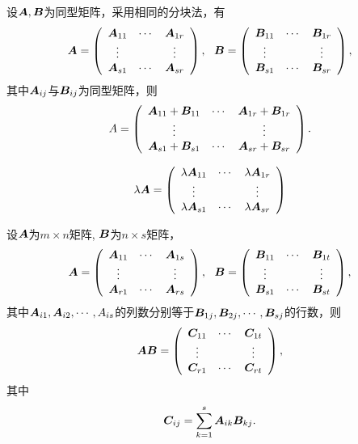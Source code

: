 \begin{dingyi}[分块矩阵的加法]
  设$\boldsymbol{A}, \boldsymbol{B}$为同型矩阵，采用相同的分块法，有
  $$
  \A = \left(
    \begin{array}{ccc}
      \A_{11} & \cd & \A_{1r} \\
      \vd   &     & \vd   \\
      \A_{s1} & \cd & \A_{sr}
    \end{array}
  \right), \ \ 
  \B = \left(
    \begin{array}{ccc}
      \B_{11} & \cd & \B_{1r} \\
      \vd   &     & \vd   \\
      \B_{s1} & \cd & \B_{sr}
    \end{array}
  \right),
  $$
  其中$\boldsymbol{A}_{ij}$与$\boldsymbol{B}_{ij}$为同型矩阵，则
  $$
  A = \left(
    \begin{array}{ccc}
      \boldsymbol{A}_{11} + \boldsymbol{B}_{11}  & \cdots & \boldsymbol{A}_{1r} + \boldsymbol{B}_{1r} \\
      \vdots   &     & \vdots   \\
      \boldsymbol{A}_{s1} + \boldsymbol{B}_{s1}  & \cdots & \boldsymbol{A}_{sr} + \boldsymbol{B}_{sr}
    \end{array}
  \right).
  $$
\end{dingyi}


\begin{dingyi}[分块矩阵的数乘]
  $$
  \lambda \boldsymbol{A} = \left(
    \begin{array}{ccc}
      \lambda \boldsymbol{A}_{11} & \cdots & \lambda \boldsymbol{A}_{1r} \\
      \vdots   &     & \vdots   \\
      \lambda \boldsymbol{A}_{s1} & \cdots & \lambda \boldsymbol{A}_{sr}
    \end{array}
  \right)
  $$    
\end{dingyi}


\begin{dingyi}[分块矩阵的乘法]
  设$\boldsymbol{A}$为$m\times n$矩阵, $\boldsymbol{B}$为$n \times s$矩阵，
  $$
  \A = \left(
    \begin{array}{ccc}
      \A_{11} & \cd & \A_{1s} \\
      \vd   &     & \vd   \\
      \A_{r1} & \cd & \A_{rs}
    \end{array}
  \right), \ \ 
  \B = \left(
    \begin{array}{ccc}
      \B_{11} & \cd & \B_{1t} \\
      \vd   &     & \vd   \\
      \B_{s1} & \cd & \B_{st}
    \end{array}
  \right),
  $$
  其中$\boldsymbol{A}_{i1}, \boldsymbol{A}_{i2}, \cdots, A_{is}$的列数分别等于$\boldsymbol{B}_{1j}, \boldsymbol{B}_{2j}, \cdots, \boldsymbol{B}_{sj}$的行数，则
  $$
  \boldsymbol{A} \boldsymbol{B} = \left(
    \begin{array}{ccc}
      \boldsymbol{C}_{11}   & \cdots & \boldsymbol{C}_{1t}  \\
      \vdots   &     & \vdots   \\
      \boldsymbol{C}_{r1}   & \cdots & \boldsymbol{C}_{rt}
    \end{array}
  \right),
  $$
  其中
  $$
  \boldsymbol{C}_{ij} = \sum_{k=1}^s \boldsymbol{A}_{ik} \boldsymbol{B}_{kj}.
  $$
\end{dingyi}



